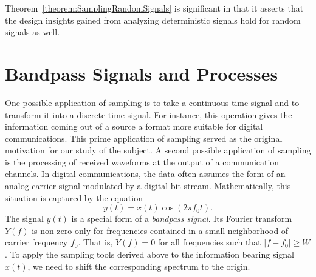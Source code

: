 Theorem~\ref{theorem:SamplingRandomSignals} is significant in that it asserts that the design insights gained from analyzing deterministic signals hold for random signals as well.


\section{Bandpass Signals and Processes}

One possible application of sampling is to take a continuous-time signal and to transform it into a discrete-time signal.
For instance, this operation gives the information coming out of a source a format more suitable for digital communications.
This prime application of sampling served as the original motivation for our study of the subject.
A second possible application of sampling is the processing of received waveforms at the output of a communication channels.
In digital communications, the data often assumes the form of an analog carrier signal modulated by a digital bit stream.
Mathematically, this situation is captured by the equation
\begin{equation*}
y(t) = x(t) \cos (2 \pi f_0 t) .
\end{equation*}
The signal $y(t)$ is a special form of a \emph{bandpass signal}.
Its Fourier transform $Y(f)$ is non-zero only for frequencies contained in a small neighborhood of carrier frequency $f_0$.
That is, $Y(f) = 0$ for all frequencies such that $|f - f_0| \geq W$.
To apply the sampling tools derived above to the information bearing signal $x(t)$, we need to shift the corresponding spectrum to the origin.

